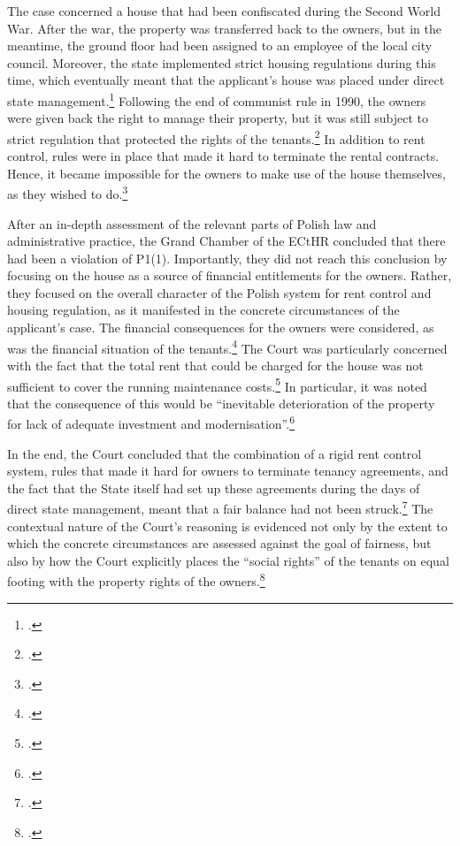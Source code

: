 The case concerned a house that had been confiscated during the Second World War. After the war, the property was transferred back to the owners, but in the meantime, the ground floor had been assigned to an employee of the local city council. Moreover, the state implemented strict housing regulations during this time, which eventually meant that the applicant's house was placed under direct state management.\footcite[20-31]{hutten06} Following the end of communist rule in 1990, the owners were given back the right to manage their property, but it was still subject to strict regulation that protected the rights of the tenants.\footcite[31-53]{hutten06} In addition to rent control, rules were in place that made it hard to terminate the rental contracts. Hence, it became impossible for the owners to make use of the house themselves, as they wished to do.\footcite[20-53]{hutten06} 

After an in-depth assessment of the relevant parts of Polish law and administrative practice, the Grand Chamber of the ECtHR concluded that there had been a violation of P1(1). Importantly, they did not reach this conclusion by focusing on the house as a source of financial entitlements for the owners. Rather, they focused on the overall character of the Polish system for rent control and housing regulation, as it manifested in the concrete circumstances of the applicant's case. The financial consequences for the owners were considered, as was the financial situation of the tenants.\footcite[60-61]{hutten06} The Court was particularly concerned with the fact that the total rent that could be charged for the house was not sufficient to cover the running maintenance costs.\footcite[224]{hutten06} In particular, it was noted that the consequence of this would be ``inevitable deterioration of the property for lack of adequate investment and modernisation''.\footnote{\cite[224]{hutten06}.}

In the end, the Court concluded that the combination of a rigid rent control system, rules that made it hard for owners to terminate tenancy agreements, and the fact that the State itself had set up these agreements during the days of direct state management, meant that a fair balance had not been struck.\footcite[224-225]{hutten06} The contextual nature of the Court's reasoning is evidenced not only by the extent to which the concrete circumstances are assessed against the goal of fairness, but also by how the Court explicitly places the ``social rights'' of the tenants on equal footing with the property rights of the owners.\footcite[225]{hutten06} 

